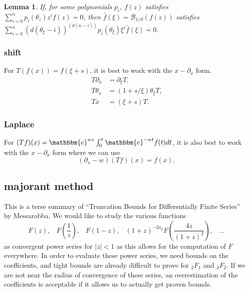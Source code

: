 \documentclass[12pt]{article}
\newcommand{\ee}[0] {\mathbbm{e}}
\numberwithin{equation}{section}
\newtheorem{lemma}[theorem]{Lemma}
\begin{document}
\begin{lemma}
If, for some polynomials $p_i$, $f(z)$ satisfies $\sum_{i=0}^{n} p_i(\theta_z) z^i f(z) = 0$,
then $\hat{f}(\xi) = \mathcal{B}_{1/d}(f(z))$ satisfies $\sum_{i=0}^{n}(d (\theta_{\xi}-i))^{(d(n-i))} p_i(\theta_{\xi}) \xi^i \hat{f}(\xi) = 0$.
\end{lemma}


\subsubsection{shift}
For $T(f(x)) = f(\xi+s)$, it is best to work with the $x-\partial_x$ form.
\begin{align*}
T \partial_x &= \partial_{\xi} T\text{,}\\
T \theta_x &= (1+s/\xi) \theta_{\xi} T \text{,}\\
T x &= (\xi+s) T\text{.}
\end{align*}

\subsubsection{Laplace}
For $(Tf)(x) = \ee^{w x}\int_{0}^{x} \ee^{-w t} f(t) dt$, it is also best to work with the $x-\partial_x$ form where we can use
\begin{equation*}
(\partial_{x}- w) (Tf)(x) = f(x)\text{.}
\end{equation*}



\subsection{majorant method}

This is a terse summary of ``Truncation Bounds for Differentially Finite Series'' by Messarobba. We would like to study the various functions
\begin{equation*}
F\left(z\right)\text{,} \quad F\left(\frac{1}{z}\right)\text{,} \quad F\left(1-z\right)\text{,} \quad  (1+z)^{-2a_p} F\left(\frac{4z}{(1+z)^2}\right)\text{,} \quad \dots
\end{equation*}
as convergent power series for $|z|<1$ as this allows for the computation of $F$ everywhere. In order to evaluate these power series, we need bounds on the coefficients, and tight bounds are already difficult to prove for ${}_2 F_1$ and ${}_3 F_2$. If we are not near the radius of convergence of these series, an overestimation of the coefficients is acceptable if it allows us to actually get proven bounds.
\end{document}
